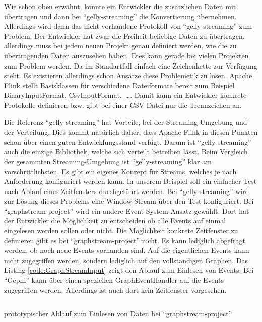 Wie schon oben erwähnt, könnte ein Entwickler die zusätzlichen Daten mit
übertragen und dann bei \enquote{gelly-streaming} die Konvertierung übernehmen.
Allerdings wird dann das nicht vorhandene Protokoll von \enquote{gelly-streaming}
zum Problem. Der Entwickler hat zwar die Freiheit beliebige Daten zu übertragen,
allerdings muss bei jedem neuen Projekt genau definiert werden, wie die zu
übertragenden Daten auszusehen haben. Dies kann gerade bei vielen Projekten zum
Problem werden. Da im Standartfall einfach eine Zeichenkette zur Verfügung steht.
Es existieren allerdings schon Ansätze diese Problemetik zu lösen. Apache Flink
stellt Basisklassen für verschiedene Dateiformate bereit zum Beispiel
BinaryInputFormat, CsvInputFormat,~\dots . Damit kann ein Entwickler konkrete
Protokolle definieren bzw. gibt bei einer CSV-Datei nur die Trennzeichen an.

Die Referenz \enquote{gelly-streaming} hat Vorteile, bei der Streaming-Umgebung
und der Verteilung. Dies kommt natürlich daher, dass Apache Flink in diesen
Punkten schon über einen guten Entwicklungsstand verfügt. Darum ist
\enquote{gelly-streaming} auch die einzige Bibliothek, welche sich verteilt
betreiben lässt. Beim Vergleich der gesammten Streaming-Umgebung ist
\enquote{gelly-streaming} klar am vorschrittlichsten. Es gibt ein eigenes
Konzept für Streams, welches je nach Anforderung konfiguriert werden kann. In
unserem Beispiel soll ein einfacher Test nach Ablauf eines Zeitfensters
durchgeführt werden. Bei \enquote{gelly-streaming} wird zur Lösung dieses
Problems eine Window-Stream über den Test konfiguriert. Bei \enquote{graphstream-project}
wird ein andere Event-System-Ansatz gewählt. Dort hat der Entwickler die
Möglichkeit zu entscheiden ob alle Events auf einmal eingelesen werden sollen
oder nicht. Die Möglichkeit konkrete Zeitfenster zu definieren gibt es bei
\enquote{graphstream-project} nicht. Es kann lediglich abgefragt werden, ob noch
neue Events vorhanden sind. Auf die eigentlichen Events kann nicht zugegriffen
werden, sondern lediglich auf den vollständigen Graphen. Das Listing
\ref{code:GraphStreamInput} zeigt den Ablauf zum Einlesen von Events. Bei \enquote{Gephi}
kann über einen speziellen GraphEventHandler auf die Events zugegriffen werden.
Allerdings ist auch dort kein Zeitfenster vorgesehen.

\begin{listing}
\inputminted[breaklines=true]{java}{../material/code/GraphStreamInput.java}
\caption{prototypischer Ablauf zum Einlesen von Daten bei \enquote{graphstream-project}}
\label{code:GraphStreamInput}
\end{listing}

